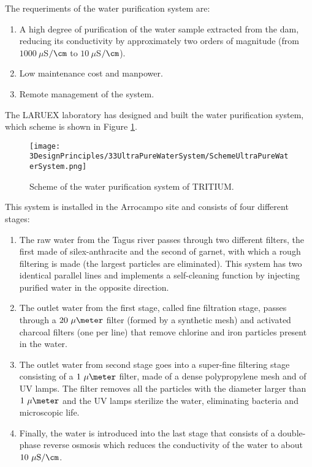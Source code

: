 The requeriments of the water purification system are:

\begin{enumerate}

\item{} A high degree of purification of the water sample extracted from the dam, reducing its conductivity by approximately two orders of magnitude (from $1000~\mu$S$/\cm$ to $10~\mu$S$/\cm$).

\item{} Low maintenance cost  and manpower.

\item{} Remote management of the system.
\end{enumerate}

The LARUEX laboratory has designed and built the water purification system, which scheme is shown in Figure \ref{fig:WPSScheme}.

\begin{figure}[htbp]
\centering
\texttt{[image: 3DesignPrinciples/33UltraPureWaterSystem/SchemeUltraPureWaterSystem.png]}
\caption{Scheme of the water purification system of TRITIUM.\label{fig:WPSScheme}}
\end{figure}
This system is installed in the Arrocampo site and consists of four different stages:

\begin{enumerate}
\item{} The raw water from the Tagus river passes through two different filters, the first made of silex-anthracite and the second of garnet, with which a rough filtering is made (the largest particles are eliminated). This system has two identical parallel lines and implements a self-cleaning function by injecting purified water in the opposite direction.

\item{} The outlet water from the first stage, called fine filtration stage, passes through a $20~\mu\meter$ filter (formed by a synthetic mesh) and activated charcoal filters (one per line) that remove chlorine and iron particles present in the water.

\item{} The outlet water from second stage goes into a super-fine filtering stage consisting of a $1~\mu\meter$ filter, made of a dense polypropylene mesh and of UV lamps. The filter removes all the particles with the diameter larger than $1~\mu\meter$ and the UV lamps sterilize the water, eliminating bacteria and microscopic life.

\item{} Finally, the water is introduced into the last stage that consists of a double-phase reverse osmosis which  reduces the conductivity of the water to about $10~\mu\mathrm{S}/\cm$. 

\end{enumerate}

